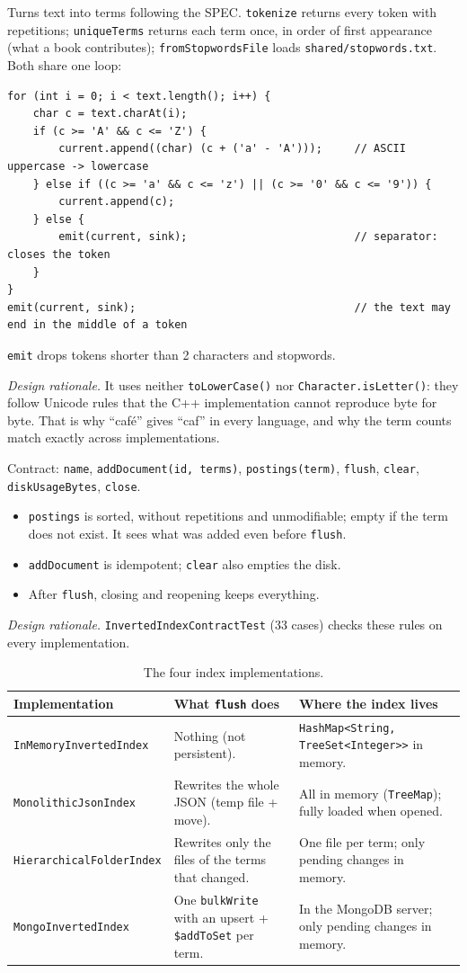 \documentclass[11pt,a4paper]{article}
\newcommand{\code}[1]{\texttt{#1}}
\newcommand{\cls}[2]{\par\medskip\noindent{\large\bfseries\code{#1}}\hspace{0.6em}{\small\color{muted}#2}\par\nopagebreak\smallskip}
\newcommand{\why}[1]{\par\noindent\textit{Design rationale.} #1\par}
\begin{document}
\cls{Tokenizer}{class}
Turns text into terms following the SPEC. \code{tokenize} returns every token with repetitions;
\code{uniqueTerms} returns each term once, in order of first appearance (what a book contributes);
\code{fromStopwordsFile} loads \code{shared/stopwords.txt}. Both share one loop:
\begin{lstlisting}
for (int i = 0; i < text.length(); i++) {
    char c = text.charAt(i);
    if (c >= 'A' && c <= 'Z') {
        current.append((char) (c + ('a' - 'A')));     // ASCII uppercase -> lowercase
    } else if ((c >= 'a' && c <= 'z') || (c >= '0' && c <= '9')) {
        current.append(c);
    } else {
        emit(current, sink);                          // separator: closes the token
    }
}
emit(current, sink);                                  // the text may end in the middle of a token
\end{lstlisting}
\code{emit} drops tokens shorter than 2 characters and stopwords.
\why{It uses neither \code{toLowerCase()} nor \code{Character.isLetter()}: they follow Unicode
rules that the C++ implementation cannot reproduce byte for byte. That is why ``café'' gives
``caf'' in every language, and why the term counts match exactly across implementations.}

\cls{InvertedIndex}{interface}
Contract: \code{name}, \code{addDocument(id, terms)}, \code{postings(term)}, \code{flush},
\code{clear}, \code{diskUsageBytes}, \code{close}.
\begin{itemize}
  \item \code{postings} is sorted, without repetitions and unmodifiable; empty if the term does not
        exist. It sees what was added even before \code{flush}.
  \item \code{addDocument} is idempotent; \code{clear} also empties the disk.
  \item After \code{flush}, closing and reopening keeps everything.
\end{itemize}
\why{\code{InvertedIndexContractTest} (33 cases) checks these rules on every implementation.}

\begin{table}[H]
\centering\small
\begin{tabularx}{\linewidth}{@{}l Y Y@{}}
\toprule
Implementation & What \code{flush} does & Where the index lives \\
\midrule
\code{InMemoryInvertedIndex} & Nothing (not persistent). & \code{HashMap<String, TreeSet<Integer>>} in memory. \\
\code{MonolithicJsonIndex} & Rewrites the whole JSON (temp file + move). & All in memory (\code{TreeMap}); fully loaded when opened. \\
\code{HierarchicalFolderIndex} & Rewrites only the files of the terms that changed. & One file per term; only pending changes in memory. \\
\code{MongoInvertedIndex} & One \code{bulkWrite} with an upsert + \code{\$addToSet} per term. & In the MongoDB server; only pending changes in memory. \\
\bottomrule
\end{tabularx}
\caption{The four index implementations.}
\end{table}
\end{document}
